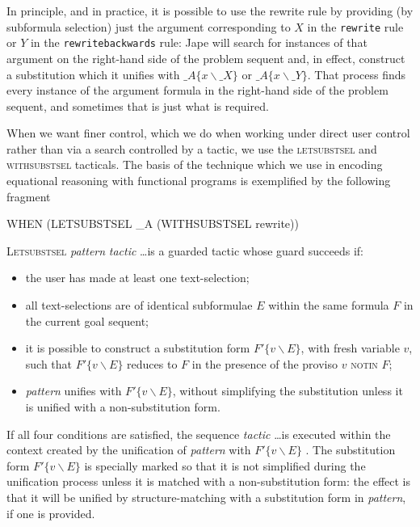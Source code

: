 In principle, and in practice, it is possible to use the rewrite rule by providing (by subformula selection) just the argument corresponding to $X$ in the \texttt{rewrite} rule or $Y$ in the \texttt{rewritebackwards} rule: Jape will search for instances of that argument on the right-hand side of the problem sequent and, in effect, construct a substitution which it unifies with $\_A\{x\backslash\_X\}$ or $\_A\{x\backslash\_Y\}$. That process finds every instance of the argument formula in the right-hand side of the problem sequent, and sometimes that is just what is required.

When we want finer control, which we do when working under direct user control rather than via a search controlled by a tactic, we use the \textsc{letsubstsel} and \textsc{withsubstsel} tacticals. The basis of the technique which we use in encoding equational reasoning with functional programs is exemplified by the following fragment
\begin{japeish}
WHEN (LETSUBSTSEL \_A (WITHSUBSTSEL rewrite))
\end{japeish}

\textsc{Letsubstsel} \textit{pattern} \textit{tactic} \dots  is a guarded tactic whose guard succeeds if:
\begin{itemize}
\item the user has made at least one text-selection;
\item all text-selections are of identical subformulae $E$ within the same formula $F$ in the current goal sequent;
\item it is possible to construct a substitution form $F'\{v\backslash E\}$, with fresh variable $v$, such that $F'\{v\backslash E\}$ reduces to $F$ in the presence of the proviso $v$ \textsc{notin} $F$;
\item \textit{pattern} unifies with $F'\{v\backslash E\}$, without simplifying the substitution unless it is unified with a non-substitution form.
\end{itemize}


If all four conditions are satisfied, the sequence \textit{tactic} \dots  is executed within the context created by the unification of \textit{pattern} with $F'\{v\backslash E\}$ . The substitution form $F'\{v\backslash E\}$ is specially marked so that it is not simplified during the unification process unless it is matched with a non-substitution form: the effect is that it will be unified by structure-matching with a substitution form in \textit{pattern}, if one is provided.

